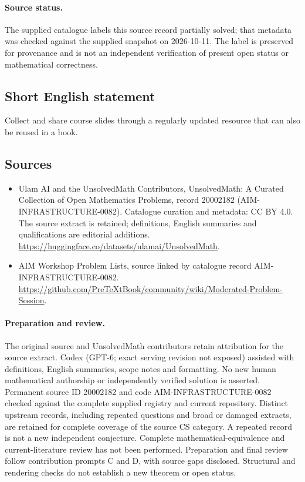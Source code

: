 \documentclass[11pt]{article}
\begin{document}
\paragraph{Source status.}
The supplied catalogue labels this source record partially solved; that metadata was checked against the supplied snapshot on 2026-10-11. The label is preserved for provenance and is not an independent verification of present open status or mathematical correctness.
\subsection{Short English statement}
Collect and share course slides through a regularly updated resource that can also be reused in a book.
\subsection{Sources}
\begin{itemize}
\item[\hypertarget{source:20002182:1}{S1}] Ulam AI and the UnsolvedMath Contributors, UnsolvedMath: A Curated Collection of Open Mathematics Problems, record 20002182 (AIM-INFRASTRUCTURE-0082). Catalogue curation and metadata: CC BY 4.0. The source extract is retained; definitions, English summaries and qualifications are editorial additions.
\url{https://huggingface.co/datasets/ulamai/UnsolvedMath}.
\item[\hypertarget{source:20002182:2}{S2}] AIM Workshop Problem Lists, source linked by catalogue record AIM-INFRASTRUCTURE-0082.
\url{https://github.com/PreTeXtBook/community/wiki/Moderated-Problem-Session}.
\end{itemize}
\paragraph{Preparation and review.}
The original source and UnsolvedMath contributors retain attribution for the source extract. Codex (GPT-6; exact serving revision not exposed) assisted with definitions, English summaries, scope notes and formatting. No new human mathematical authorship or independently verified solution is asserted. Permanent source ID 20002182 and code AIM-INFRASTRUCTURE-0082 checked against the complete supplied registry and current repository. Distinct upstream records, including repeated questions and broad or damaged extracts, are retained for complete coverage of the source CS category. A repeated record is not a new independent conjecture. Complete mathematical-equivalence and current-literature review has not been performed. Preparation and final review follow contribution prompts C and D, with source gaps disclosed. Structural and rendering checks do not establish a new theorem or open status.
\label{end:20002182}
\end{document}
